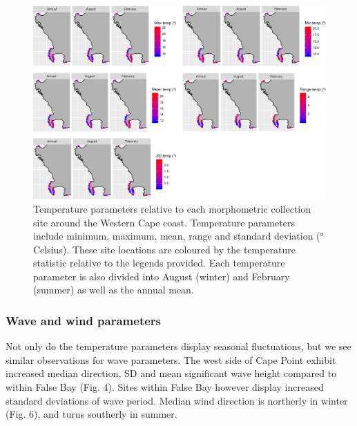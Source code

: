 \documentclass[10pt,a4,]{article}
\makeatletter
\def\maxwidth{\ifdim\Gin@nat@width>\linewidth\linewidth
\else\Gin@nat@width\fi}
\let\Oldincludegraphics\includegraphics
\renewcommand{\includegraphics}[1]{\Oldincludegraphics[width=\maxwidth]{#1}}
\makeatother
\begin{document}
\begin{figure}
\centering
\includegraphics{chapter_2_files/figure-latex/unnamed-chunk-12-1.pdf}
\caption{Temperature parameters relative to each morphometric collection
site around the Western Cape coast. Temperature parameters include
minimum, maximum, mean, range and standard deviation (° Celsius). These
site locations are coloured by the temperature statistic relative to the
legends provided. Each temperature parameter is also divided into August
(winter) and February (summer) as well as the annual mean.}
\end{figure}

\hypertarget{wave-and-wind-parameters}{%
\subsubsection{Wave and wind
parameters}\label{wave-and-wind-parameters}}

Not only do the temperature parameters display seasonal fluctuations,
but we see similar observations for wave parameters. The west side of
Cape Point exhibit increased median direction, SD and mean significant
wave height compared to within False Bay (Fig. 4). Sites within False
Bay however display increased standard deviations of wave period. Median
wind direction is northerly in winter (Fig. 6), and turns southerly in
summer.
\end{document}
